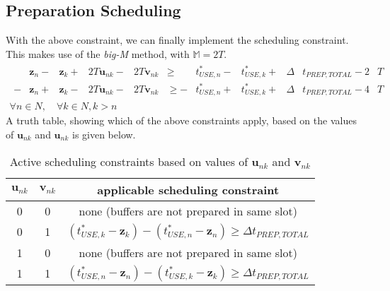 \subsection{Preparation Scheduling}\label{SS.constr9}
With the above constraint, we can finally implement the scheduling constraint.
This makes use of the \emph{big-M} method, with $\mathbb{M} = 2 T$.
\begin{equation}
    \begin{split}
        \begin{alignedat}{10}
            &\boldsymbol{z}_{n} {}-{} &\boldsymbol{z}_{k} {}+{} &2 T
            \boldsymbol{u}_{nk} {}-{} &2 T \boldsymbol{v}_{nk} &\ge
            &t_{\mathit{USE},n}^{*} {}-{} &t_{USE,k}^{*} {}+{}
            &\Delta &t_{\mathit{PREP,TOTAL}} {}-{} 2 &T\\
            - &\boldsymbol{z}_{n} {}+{} &\boldsymbol{z}_{k} {}-{} &2 T
            \boldsymbol{u}_{nk} {}-{} &2 T \boldsymbol{v}_{nk} &\ge
            - &t_{\mathit{USE},n}^{*} {}+{} &t_{\mathit{USE},k}^{*} {}+{}
            &\Delta &t_{\mathit{PREP,TOTAL}} {}-{} 4 &T
        \end{alignedat}
        \\\forall n \in N, \quad \forall k \in N, k > n
    \end{split}
    \label{eq.constr9}
\end{equation}
A truth table, showing which of the above constraints apply, based on the
values of $\boldsymbol{u}_{nk}$ and $\boldsymbol{u}_{nk}$ is given below.
\begin{table}[h!]
    \centering
    \caption{Active scheduling constraints based on values of 
             $\boldsymbol{u}_{nk}$ and $\boldsymbol{v}_{nk}$}
    \label{tbl.truthw}
    \begin{tabular}{c c | c}
        $\boldsymbol{u}_{nk}$ & $\boldsymbol{v}_{nk}$
        & applicable scheduling constraint\\ \hline
        0 & 0 & none (buffers are not prepared in same slot)\\
        0 & 1 & $\left( t_{\mathit{USE},k}^{*} - \boldsymbol{z}_{k} \right)
            - \left( t_{\mathit{USE},n}^{*} - \boldsymbol{z}_{n} \right)
            \ge \Delta t_{\mathit{PREP,TOTAL}}$\\
        1 & 0 & none (buffers are not prepared in same slot)  \\
        1 & 1 & $\left( t_{\mathit{USE},n}^{*} - \boldsymbol{z}_{n} \right)
            - \left( t_{\mathit{USE},k}^{*} - \boldsymbol{z}_{k} \right)
            \ge \Delta t_{\mathit{PREP,TOTAL}}$\\
    \end{tabular}
\end{table}

